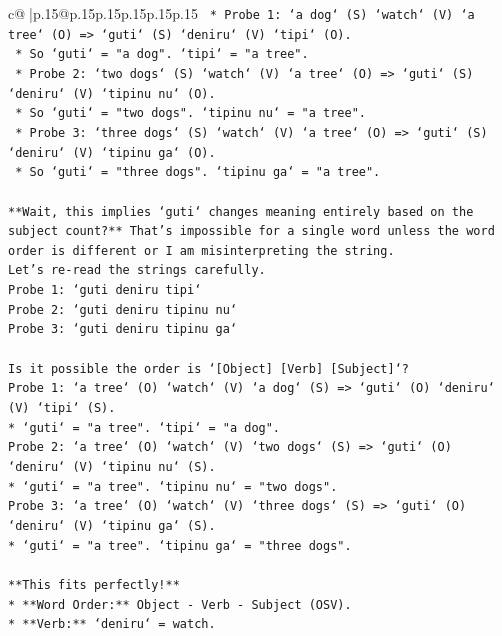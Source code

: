 \documentclass{article}
\begin{document}
{\begin{supertabular}{c@{$\;$}|p{.15\linewidth}@{}p{.15\linewidth}p{.15\linewidth}p{.15\linewidth}p{.15\linewidth}p{.15\linewidth}}
{{{\texttt{    *   Probe 1: `a dog` (S) `watch` (V) `a tree` (O) => `guti` (S) `deniru` (V) `tipi` (O).} \\
\texttt{        *   So `guti` = "a dog". `tipi` = "a tree".} \\
\texttt{    *   Probe 2: `two dogs` (S) `watch` (V) `a tree` (O) => `guti` (S) `deniru` (V) `tipinu nu` (O).} \\
\texttt{        *   So `guti` = "two dogs". `tipinu nu` = "a tree".} \\
\texttt{    *   Probe 3: `three dogs` (S) `watch` (V) `a tree` (O) => `guti` (S) `deniru` (V) `tipinu ga` (O).} \\
\texttt{        *   So `guti` = "three dogs". `tipinu ga` = "a tree".} \\
\\ 
\texttt{**Wait, this implies `guti` changes meaning entirely based on the subject count?** That's impossible for a single word unless the word order is different or I am misinterpreting the string.} \\
\texttt{Let's re{-}read the strings carefully.} \\
\texttt{Probe 1: `guti deniru tipi`} \\
\texttt{Probe 2: `guti deniru tipinu nu`} \\
\texttt{Probe 3: `guti deniru tipinu ga`} \\
\\ 
\texttt{Is it possible the order is `{[}Object{]} {[}Verb{]} {[}Subject{]}`?} \\
\texttt{Probe 1: `a tree` (O) `watch` (V) `a dog` (S) => `guti` (O) `deniru` (V) `tipi` (S).} \\
\texttt{*   `guti` = "a tree". `tipi` = "a dog".} \\
\texttt{Probe 2: `a tree` (O) `watch` (V) `two dogs` (S) => `guti` (O) `deniru` (V) `tipinu nu` (S).} \\
\texttt{*   `guti` = "a tree". `tipinu nu` = "two dogs".} \\
\texttt{Probe 3: `a tree` (O) `watch` (V) `three dogs` (S) => `guti` (O) `deniru` (V) `tipinu ga` (S).} \\
\texttt{*   `guti` = "a tree". `tipinu ga` = "three dogs".} \\
\\ 
\texttt{**This fits perfectly!**} \\
\texttt{*   **Word Order:** Object {-} Verb {-} Subject (OSV).} \\
\texttt{*   **Verb:** `deniru` = watch.} \\
}}}
\end{supertabular}}
\end{document}
